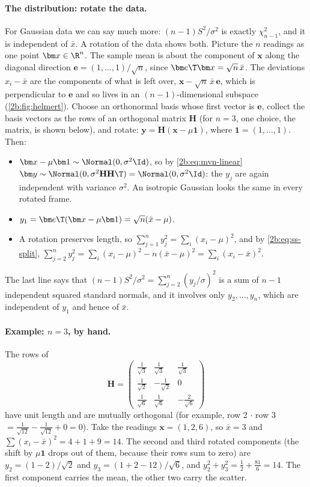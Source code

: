 \paragraph{The distribution: rotate the data.} For Gaussian data we can say much more: $(n-1)S^2/\sigma^2$ is exactly $\chi^2_{n-1}$, and it is independent of $\bar x$. A rotation of the data shows both. Picture the $n$ readings as one point $\bm x\in\R^n$. The sample mean is about the component of $\bm x$ along the diagonal direction $\bm e=(1,\dots,1)/\sqrt n$, since $\bm e\T\bm x=\sqrt n\,\bar x$. The deviations $x_i-\bar x$ are the components of what is left over, $\bm x-\sqrt n\,\bar x\,\bm e$, which is perpendicular to $\bm e$ and so lives in an $(n-1)$-dimensional subspace (\cref{2b:fig:helmert}). Choose an orthonormal basis whose first vector is $\bm e$, collect the basis vectors as the rows of an orthogonal matrix $\mathbf H$ (for $n=3$, one choice, the  matrix, is shown below), and rotate: $\bm y=\mathbf H(\bm x-\mu\bm 1)$, where $\bm1=(1,\dots,1)$. Then:
\begin{itemize}
  \item $\bm x-\mu\bm1\sim\Normal(0,\sigma^2\Id)$, so by \eqref{2b:eq:mvn-linear} $\bm y\sim\Normal(0,\sigma^2\mathbf H\mathbf H\T)=\Normal(0,\sigma^2\Id)$: the $y_j$ are again independent with variance $\sigma^2$. An isotropic Gaussian looks the same in every rotated frame.
  \item $y_1=\bm e\T(\bm x-\mu\bm1)=\sqrt n(\bar x-\mu)$.
  \item A rotation preserves length, so $\sum_{j=1}^ny_j^2=\sum_i(x_i-\mu)^2$, and by \eqref{2b:eq:ss-split}, $\sum_{j=2}^ny_j^2=\sum_i(x_i-\mu)^2-n(\bar x-\mu)^2=\sum_i(x_i-\bar x)^2$.
\end{itemize}
The last line says that $(n-1)S^2/\sigma^2=\sum_{j=2}^n(y_j/\sigma)^2$ is a sum of $n-1$ independent squared standard normals, and it involves only $y_2,\dots,y_n$, which are independent of $y_1$ and hence of $\bar x$.

\paragraph{Example: $n=3$, by hand.} The rows of
\[
  \mathbf H=\begin{pmatrix}\tfrac1{\sqrt3}&\tfrac1{\sqrt3}&\tfrac1{\sqrt3}\\[2pt] \tfrac1{\sqrt2}&-\tfrac1{\sqrt2}&0\\[2pt] \tfrac1{\sqrt6}&\tfrac1{\sqrt6}&-\tfrac2{\sqrt6}\end{pmatrix}
\]
have unit length and are mutually orthogonal (for example, row 2 $\cdot$ row 3 $=\frac1{\sqrt{12}}-\frac1{\sqrt{12}}+0=0$). Take the readings $\bm x=(1,2,6)$, so $\bar x=3$ and $\sum(x_i-\bar x)^2=4+1+9=14$. The second and third rotated components (the shift by $\mu\bm1$ drops out of them, because their rows sum to zero) are $y_2=(1-2)/\sqrt2$ and $y_3=(1+2-12)/\sqrt6$, and $y_2^2+y_3^2=\frac12+\frac{81}6=14$. The first component carries the mean, the other two carry the scatter.

